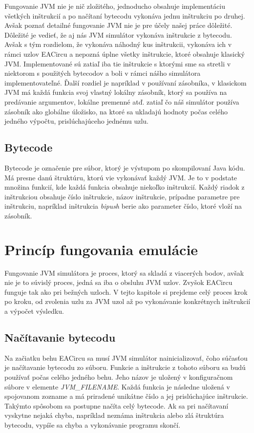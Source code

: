 Fungovanie JVM nie je nič zložitého, jednoducho obsahuje implementáciu všetkých inštrukcií a po načítaní bytecodu vykonáva jednu inštrukciu po druhej. Avšak poznať detailné fungovanie JVM nie je pre účely našej práce dôležité. Dôležité je vedieť, že aj nás JVM simulátor vykonáva inštrukcie z bytecodu. Avšak s tým rozdielom, že vykonáva náhodný kus inštrukcii, vykonáva ich v rámci uzlov EACircu a nepozná úplne všetky inštrukcie, ktoré obsahuje klasický JVM. Implementované sú zatiaľ iba tie inštrukcie s ktorými sme sa stretli v niektorom s použitých bytecodov a boli v rámci nášho simulátora implementovateľné. Ďalší rozdiel je napríklad v používaní zásobníka, v klasickom JVM má každá funkcia svoj vlastný lokálny zásobník, ktorý sa používa na predávanie argumentov, lokálne premenné atď. zatiaľ čo náš simulátor používa zásobník ako globálne úložisko, na ktoré sa ukladajú hodnoty počas celého jedného výpočtu, prislúchajúceho jednému uzlu.  

\subsection{Bytecode}
\label{subsec:bytecode}

Bytecode je označenie pre súbor, ktorý je výstupom po skompilovaní Java kódu. Má presne danú štruktúru, ktorú vie vykonávať každý JVM. Je to v podstate množina funkcií, kde každá funkcia obsahuje niekoľko inštrukcií. Každý riadok z inštrukciou obsahuje číslo inštrukcie, názov inštrukcie, prípadne parametre pre inštrukciu, napríklad inštrukcia \textit{bipush} berie ako parameter číslo, ktoré vloží na zásobník. 

\section{Princíp fungovania emulácie}
\label{sec:jvm-principle}

Fungovanie JVM simulátora je proces, ktorý sa skladá z viacerých bodov, avšak nie je to súvislý proces, jedná sa iba o obsluhu JVM uzlov. Zvyšok EACircu funguje tak ako pri bežných uzloch. V tejto kapitole si prejdeme celý proces krok po kroku, od zvolenia uzlu za JVM uzol až po vykonávanie konkrétnych inštrukcií a výpočet výsledku. 

\subsection{Načítavanie bytecodu}
\label{parsing-bytecode}

Na začiatku behu EACircu sa musí JVM simulátor nainicializovať, čoho súčasťou je načítavanie bytecodu zo súboru. Funkcie a inštrukcie z tohoto súboru sa budú používať počas celého jedného behu. Jeho názov je uložený v konfiguračnom súbore v elemente \textit{JVM\_FILENAME}. Každá funkcia je následne uložená v spojovanom zozname a má priradené unikátne číslo a jej prislúchajúce inštrukcie. Takýmto spôsobom sa postupne načíta celý bytecode. Ak sa pri načítavaní vyskytne nejaká chyba, napríklad neznáma inštrukcia alebo zlá štruktúra bytecodu, vypíše sa chyba a vykonávanie programu skončí.

